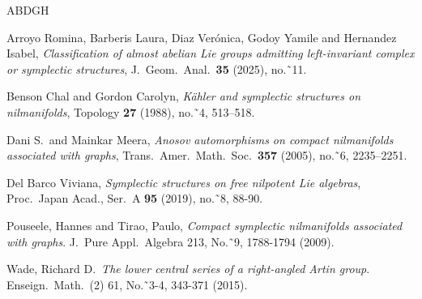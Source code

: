 \documentclass[a4paper,11pt]{amsart}
\theoremstyle{definition}
\theoremstyle{remark}
\numberwithin{equation}{section}
\begin{document}
\begin{thebibliography}{ABDGH}

 Arroyo Romina, Barberis Laura, Diaz Verónica, Godoy Yamile and Hernandez Isabel,
\emph{Classification of almost abelian Lie groups admitting left-invariant complex or symplectic structures},
J.\ Geom.\ Anal.\ \textbf{35} (2025), no.˜11.

Benson Chal and Gordon Carolyn, 
\emph{Kähler and symplectic structures on nilmanifolds},
Topology \textbf{27} (1988), no.˜4, 513--518.

Dani S.\ and Mainkar Meera, 
\emph{Anosov automorphisms on compact nilmanifolds associated with graphs},
Trans.\ Amer.\ Math.\ Soc.\ \textbf{357} (2005), no.˜6, 2235--2251.

Del Barco Viviana,
\emph{Symplectic structures on free nilpotent Lie algebras}, Proc.\ Japan Acad., Ser.\ A \textbf{95} (2019), no.˜8, 88-90.

 Pouseele, Hannes and Tirao, Paulo,
   \emph{Compact symplectic nilmanifolds associated with graphs}. 
     J.\ Pure Appl.\ Algebra 213, No.˜9, 1788-1794 (2009).

 Wade, Richard D.\,
   \emph{The lower central series of a right-angled Artin group}. 
      Enseign.\ Math.\ (2) 61, No.˜3-4, 343-371 (2015).     
     
  		
\end{thebibliography}

    
 \newpage
\end{document}
